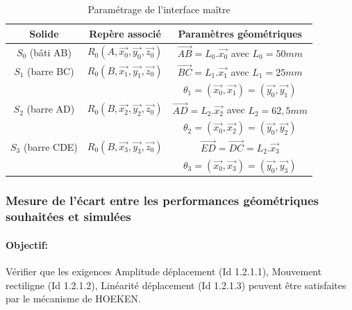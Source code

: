 \begin{table}[ht!]
\begin{center}
\begin{tabular}{|c|c|c|}
\hline
Solide & Repère associé	& Paramètres géométriques \\
\hline
$S_0$ (bâti AB)	& $R_0(A,\overrightarrow{x_0},\overrightarrow{y_0},\overrightarrow{z_0})$ & $\overrightarrow{AB}=L_0.\overrightarrow{x_0}$ avec $L_0 = 50mm$ \\
\hline
$S_1$ (barre BC) & $R_0(B,\overrightarrow{x_1},\overrightarrow{y_1},\overrightarrow{z_0})$ & $\overrightarrow{BC}=L_1.\overrightarrow{x_1}$  avec $L_1 = 25mm$ \\
 & & $\theta_1=(\overrightarrow{x_0},\overrightarrow{x_1})=(\overrightarrow{y_0},\overrightarrow{y_1})$ \\
$S_2$  (barre AD) & $R_0(B,\overrightarrow{x_2},\overrightarrow{y_2},\overrightarrow{z_0})$	& $\overrightarrow{AD}=L_2.\overrightarrow{x_2}$ avec $L_2 = 62,5 mm$ \\
 & & $\theta_2=(\overrightarrow{x_0},\overrightarrow{x_2})=(\overrightarrow{y_0},\overrightarrow{y_2})$ \\
\hline
$S_3$ (barre CDE) & $R_0(B,\overrightarrow{x_3},\overrightarrow{y_3},\overrightarrow{z_0})$ & $\overrightarrow{ED}=\overrightarrow{DC}=L_2.\overrightarrow{x_3}$ \\
 & & $\theta_3=(\overrightarrow{x_0},\overrightarrow{x_3})=(\overrightarrow{y_0},\overrightarrow{y_3})$ \\
\hline
\end{tabular}
 \caption{Paramétrage de l'interface maître}
 \label{tab1}
\end{center}
\end{table}


\subsubsection{Mesure de l'écart entre les performances géométriques souhaitées et simulées}

\paragraph{Objectif:} Vérifier que les exigences \og Amplitude déplacement \fg (Id 1.2.1.1), \og Mouvement rectiligne \fg (Id 1.2.1.2), \og Linéarité déplacement \fg (Id 1.2.1.3) peuvent être satisfaites par le mécanisme de HOEKEN.


